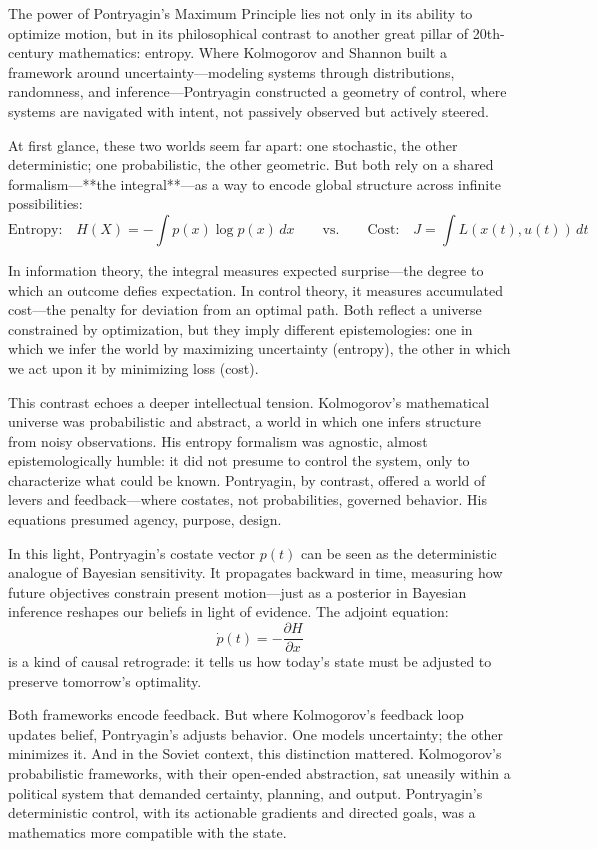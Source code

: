 The power of Pontryagin’s Maximum Principle lies not only in its ability to optimize motion, but in its philosophical contrast to another great pillar of 20th-century mathematics: entropy. Where Kolmogorov and Shannon built a framework around uncertainty—modeling systems through distributions, randomness, and inference—Pontryagin constructed a geometry of control, where systems are navigated with intent, not passively observed but actively steered.

At first glance, these two worlds seem far apart: one stochastic, the other deterministic; one probabilistic, the other geometric. But both rely on a shared formalism—**the integral**—as a way to encode global structure across infinite possibilities:
\[
\text{Entropy:}\quad H(X) = - \int p(x) \log p(x) \, dx
\qquad \text{vs.} \qquad
\text{Cost:}\quad J = \int L(x(t), u(t)) \, dt
\]

In information theory, the integral measures expected surprise—the degree to which an outcome defies expectation. In control theory, it measures accumulated cost—the penalty for deviation from an optimal path. Both reflect a universe constrained by optimization, but they imply different epistemologies: one in which we infer the world by maximizing uncertainty (entropy), the other in which we act upon it by minimizing loss (cost).

This contrast echoes a deeper intellectual tension. Kolmogorov’s mathematical universe was probabilistic and abstract, a world in which one infers structure from noisy observations. His entropy formalism was agnostic, almost epistemologically humble: it did not presume to control the system, only to characterize what could be known. Pontryagin, by contrast, offered a world of levers and feedback—where costates, not probabilities, governed behavior. His equations presumed agency, purpose, design.

In this light, Pontryagin’s costate vector \( p(t) \) can be seen as the deterministic analogue of Bayesian sensitivity. It propagates backward in time, measuring how future objectives constrain present motion—just as a posterior in Bayesian inference reshapes our beliefs in light of evidence. The adjoint equation:
\[
\dot{p}(t) = -\frac{\partial H}{\partial x}
\]
is a kind of causal retrograde: it tells us how today's state must be adjusted to preserve tomorrow's optimality.

Both frameworks encode feedback. But where Kolmogorov’s feedback loop updates belief, Pontryagin’s adjusts behavior. One models uncertainty; the other minimizes it. And in the Soviet context, this distinction mattered. Kolmogorov’s probabilistic frameworks, with their open-ended abstraction, sat uneasily within a political system that demanded certainty, planning, and output. Pontryagin’s deterministic control, with its actionable gradients and directed goals, was a mathematics more compatible with the state.

